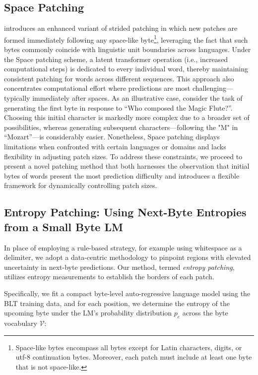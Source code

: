 \subsection{Space Patching}
\label{section:white-patch}

\citet{slagle2024spacebyte} introduces an enhanced variant of strided patching in which new patches are formed immediately following any space-like byte\footnote{
    Space-like bytes encompass all bytes except for Latin characters, digits, or utf-8 continuation bytes. Moreover, each patch must include at least one byte that is not space-like. }, leveraging the fact that such bytes commonly coincide with linguistic unit boundaries across languages. Under the Space patching scheme, a latent transformer operation (i.e., increased computational steps) is dedicated to every individual word, thereby maintaining consistent patching for words across different sequences. This approach also concentrates computational effort where predictions are most challenging—typically immediately after spaces. As an illustrative case, consider the task of generating the first byte in response to ``Who composed the Magic Flute?\uline{\hspace{.6em}}''. Choosing this initial character is markedly more complex due to a broader set of possibilities, whereas generating subsequent characters—following the "M" in ``Mozart''—is considerably easier. Nonetheless, Space patching displays limitations when confronted with certain languages or domains and lacks flexibility in adjusting patch sizes. To address these constraints, we proceed to present a novel patching method that both harnesses the observation that initial bytes of words present the most prediction difficulty and introduces a flexible framework for dynamically controlling patch sizes.

\subsection{Entropy Patching: Using Next-Byte Entropies from a Small Byte LM}
\label{section:dyn-patch}

In place of employing a rule-based strategy, for example using whitespace as a delimiter, we adopt a data-centric methodology to pinpoint regions with elevated uncertainty in next-byte predictions. Our method, termed \textit{entropy patching}, utilizes entropy measurements to establish the borders of each patch.

Specifically, we fit a compact byte-level auto-regressive language model using the {\textsc BLT} training data, and for each position, we determine the entropy of the upcoming byte under the LM’s probability distribution $p_{e}$ across the byte vocabulary $\mathcal{V}$:


